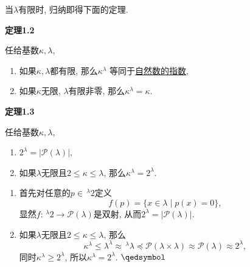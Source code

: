 当$\lambda$有限时, 归纳即得下面的定理.

\vspace{10pt}

\hypertarget{sec:定理1.2}{}
\noindent\textbf{定理1.2}

任给基数$\kappa,\lambda$,
\begin{enumerate}
    \item 如果$\kappa,\lambda$都有限, 那么$\kappa^\lambda$
    等同于\href{../../03 自然数/02 自然数算术/03 自然数的指数#nameddest=sec:定义1.1}
    {自然数的指数},
    \item 如果$\kappa$无限, $\lambda$有限非零, 那么$\kappa^\lambda=\kappa$.
\end{enumerate}

\vspace{10pt}

\hypertarget{sec:定理1.3}{}
\noindent\textbf{定理1.3}

任给基数$\kappa,\lambda$,
\begin{enumerate}
    \item $2^\lambda=|\mathcal{P}(\lambda)|$,
    \item 如果$\lambda$无限且$2\leqslant\kappa\leqslant\lambda$,
    那么$\kappa^\lambda=2^\lambda$.
\end{enumerate}



\begin{enumerate}
    \item 首先对任意的$p\in\,\!^\lambda2$定义
    \[
        f(p)=\{x\in\lambda\mid p(x)=0\},
    \]
    显然$f:\,\!^\lambda2\to\mathcal{P}(\lambda)$是双射,
    从而$2^\lambda=|\mathcal{P}(\lambda)|$.
    \item 如果$\lambda$无限且$2\leqslant\kappa\leqslant\lambda$, 那么
    \[
        \kappa^\lambda\leqslant\lambda^\lambda\approx\,\!^\lambda\lambda
        \preccurlyeq\mathcal{P}(\lambda\times\lambda)\approx
        \mathcal{P}(\lambda)\approx 2^\lambda,
    \]
    同时$\kappa^\lambda\geqslant 2^\lambda$,
    所以$\kappa^\lambda=2^\lambda$. \hfill $\qedsymbol$
\end{enumerate}


